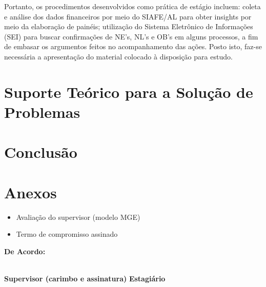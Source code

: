 \documentclass[12pt,a4paper]{article}
\begin{document}
	Portanto, os procedimentos desenvolvidos como prática de estágio incluem: 
	coleta e análise dos dados financeiros por meio do SIAFE/AL para obter insights por 
	meio da elaboração de painéis; utilização do Sistema Eletrônico de Informações (SEI) para 
	buscar confirmações de NE’s, NL’s e OB’s em alguns processos, a fim de embasar os argumentos 
	feitos no acompanhamento das ações. Posto isto, faz-se necessária a apresentação do material colocado à disposição para estudo.


	\section{Suporte Teórico para a Solução de Problemas}
	\hspace*{1,5cm}
	
	\section{Conclusão}
	
	
	\section{Anexos}
	
	\begin{itemize}
		\item Avaliação do supervisor (modelo MGE)
		\item Termo de compromisso assinado
	\end{itemize}
	
	\vspace{2cm}
	\noindent \textbf{De Acordo:}
	
	\vspace{2cm}
	\noindent \underline{\hspace{7cm}} \hfill \underline{\hspace{7cm}} \\
	\textbf{Supervisor (carimbo e assinatura)} \hfill \textbf{Estagiário}
	
\end{document}

